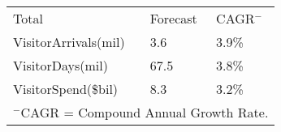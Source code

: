 \begin{tabular}[t]{p{5.4cm}p{0.9cm}p{1.2cm}}
 Total & Forecast & CAGR$^-$ \\ 
 VisitorArrivals(mil) &  3.6 & 3.9\% \\ 
  VisitorDays(mil) & 67.5 & 3.8\% \\ 
  VisitorSpend(\$bil) &  8.3 & 3.2\% \\ 
  
\multicolumn{3}{p{8.25cm}}{$^-$CAGR = Compound Annual Growth Rate.}\\ \end{tabular}
